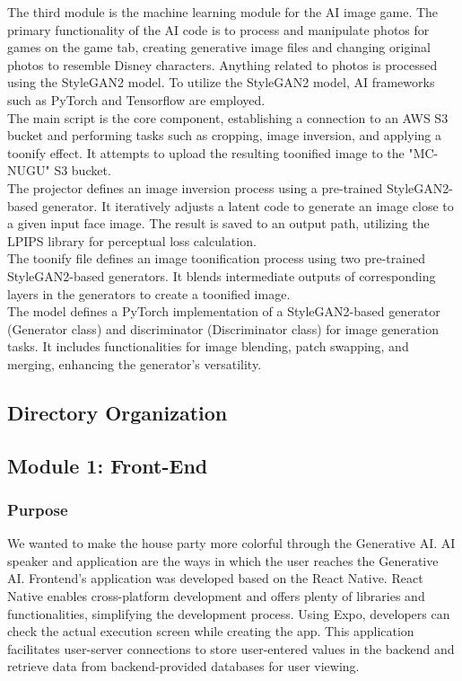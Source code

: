 \documentclass[conference]{IEEEtran}
\begin{document}
            The third module is the machine learning module for the AI image game. The primary functionality of the AI code is to process and manipulate photos for games on the game tab, creating generative image files and changing original photos to resemble Disney characters. Anything related to photos is processed using the StyleGAN2 model. To utilize the StyleGAN2 model, AI frameworks such as PyTorch and Tensorflow are employed.\\
            The main script is the core component, establishing a connection to an AWS S3 bucket and performing tasks such as cropping, image inversion, and applying a toonify effect. It attempts to upload the resulting toonified image to the "MC-NUGU" S3 bucket.\\
            The projector defines an image inversion process using a pre-trained StyleGAN2-based generator. It iteratively adjusts a latent code to generate an image close to a given input face image. The result is saved to an output path, utilizing the LPIPS library for perceptual loss calculation.\\
            The toonify file defines an image toonification process using two pre-trained StyleGAN2-based generators. It blends intermediate outputs of corresponding layers in the generators to create a toonified image.\\
            The model defines a PyTorch implementation of a StyleGAN2-based generator (Generator class) and discriminator (Discriminator class) for image generation tasks. It includes functionalities for image blending, patch swapping, and merging, enhancing the generator's versatility.\\

            
    \subsection{Directory Organization}
    \subsection{Module 1: Front-End}
        \subsubsection{Purpose}
            We wanted to make the house party more colorful through the Generative AI. AI speaker and application are the ways in which the user reaches the Generative AI. Frontend's application was developed based on the React Native. React Native enables cross-platform development and offers plenty of libraries and functionalities, simplifying the development process. Using Expo, developers can check the actual execution screen while creating the app. This application facilitates user-server connections to store user-entered values in the backend and retrieve data from backend-provided databases for user viewing.\\
            \vspace{3mm}
\end{document}
